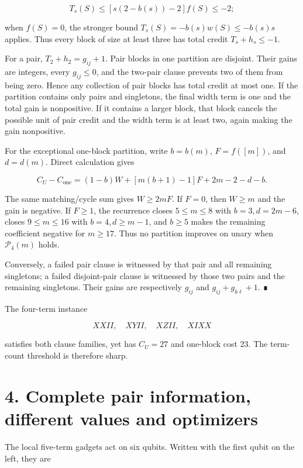 \documentclass[
  11pt,
]{article}
\begin{document}
\[
T_s(S)\le[s(2-b(s))-2]f(S)\le-2;
\]

when \(f(S)=0\), the stronger bound \(T_s(S)=-b(s)w(S)\le-b(s)s\)
applies. Thus every block of size at least three has total credit
\(T_s+h_s\le-1\).

For a pair, \(T_2+h_2=g_{ij}+1\). Pair blocks in one partition are
disjoint. Their gains are integers, every \(g_{ij}\le0\), and the
two-pair clause prevents two of them from being zero. Hence any
collection of pair blocks has total credit at most one. If the partition
contains only pairs and singletons, the final width term is one and the
total gain is nonpositive. If it contains a larger block, that block
cancels the possible unit of pair credit and the width term is at least
two, again making the gain nonpositive.

For the exceptional one-block partition, write \(b=b(m)\), \(F=f([m])\),
and \(d=d(m)\). Direct calculation gives

\[
C_U-C_{\mathrm{one}}
=(1-b)W+[m(b+1)-1]F+2m-2-d-b.
\]

The same matching/cycle sum gives \(W\ge2mF\). If \(F=0\), then
\(W\ge m\) and the gain is negative. If \(F\ge1\), the recurrence closes
\(5\le m\le8\) with \(b=3,d=2m-6\), closes \(9\le m\le16\) with
\(b=4,d\ge m-1\), and \(b\ge5\) makes the remaining coefficient negative
for \(m\ge17\). Thus no partition improves on unary when
\(\mathcal P_4(m)\) holds.

Conversely, a failed pair clause is witnessed by that pair and all
remaining singletons; a failed disjoint-pair clause is witnessed by
those two pairs and the remaining singletons. Their gains are
respectively \(g_{ij}\) and \(g_{ij}+g_{k\ell}+1\). ∎

The four-term instance

\[
XXII, \quad XYII, \quad XZII, \quad XIXX
\]

satisfies both clause families, yet has \(C_U=27\) and one-block cost
\(23\). The term-count threshold is therefore sharp.

\hypertarget{complete-pair-information-different-values-and-optimizers}{%
\section{4. Complete pair information, different values and
optimizers}\label{complete-pair-information-different-values-and-optimizers}}

The local five-term gadgets act on six qubits. Written with the first
qubit on the left, they are
\end{document}
